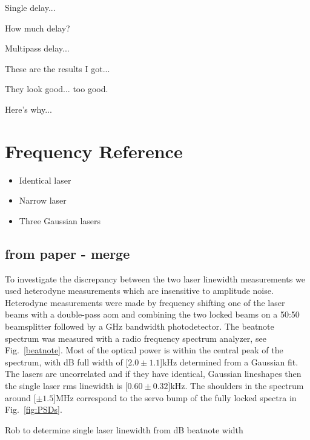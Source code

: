Single delay...

How much delay?

Multipass delay...

These are the results I got...

They look good... too good.

Here's why...\cite{richter_linewidth_1986}

\section{Frequency Reference}
\begin{itemize}
\item Identical laser
\item Narrow laser
\item Three Gaussian lasers
\end{itemize}

\subsection{from paper - merge}
To investigate the discrepancy between the two laser linewidth measurements we used heterodyne measurements which are insensitive to amplitude noise.
Heterodyne measurements were made by frequency shifting one of the laser beams with a double-pass \gls*{aom} and combining the two locked beams on a 50:50 beamsplitter followed by a \unit[1]{GHz} bandwidth photodetector.
The beatnote spectrum was measured with a radio frequency spectrum analyzer, see Fig.~\ref{beatnote}.
Most of the optical power is within the central peak of the spectrum, with \unit[-3]{dB} full width of \unit[$2.0\pm1.1$]{kHz} determined from a Gaussian fit.
The lasers are uncorrelated and if they have identical, Gaussian lineshapes then the single laser \gls*{rms} linewidth is \unit[$0.60\pm0.32$]{kHz}.
The shoulders in the spectrum around \unit[$\pm1.5$]{MHz} correspond to the servo bump of the fully locked spectra in Fig.~\ref{fig:PSDs}.

{\color{red} Rob to determine single laser linewidth from \unit[-3]{dB} beatnote width}

